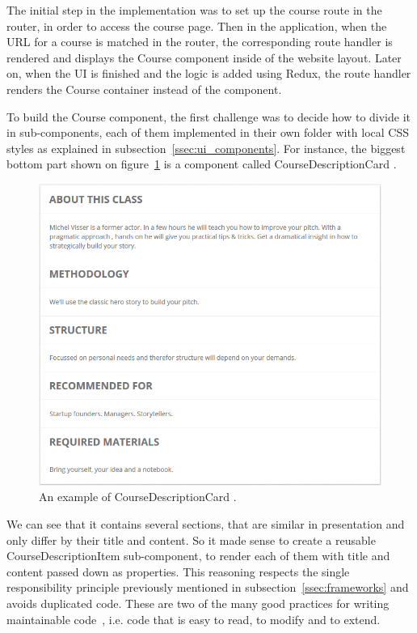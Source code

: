 The initial step in the implementation was to set up the course route in the router, in order to access the course page. Then in the application, when the URL for a course is matched in the router, the corresponding route handler is rendered and displays the \guillemotleft{} Course \guillemotright{} component inside of the website layout. Later on, when the UI is finished and the logic is added using Redux, the route handler renders the \guillemotleft{} Course \guillemotright{} container instead of the component.

To build the \guillemotleft{} Course \guillemotright{} component, the first challenge was to decide how to divide it in sub-components, each of them implemented in their own folder with local CSS styles as explained in {\sc subsection}~\ref{ssec:ui_components}. For instance, the biggest bottom part shown on {\sc figure}~\ref{fig:courseDescription} is a component called \guillemotleft{} CourseDescriptionCard \guillemotright{}.

\begin{figure}[H]
    \centering
    \includegraphics[scale=0.6]{figure/courseDescription.png}
    \caption{An example of \guillemotleft{} CourseDescriptionCard \guillemotright{}.}
    \label{fig:courseDescription}
\end{figure}

We can see that it contains several sections, that are similar in presentation and only differ by their title and content. So
it made sense to create a reusable \guillemotleft{} CourseDescriptionItem \guillemotright{} sub-component, to render each of them with title and content passed down as properties. This reasoning respects the single responsibility principle previously mentioned in {\sc subsection}~\ref{ssec:frameworks} and avoids duplicated code.
These are two of the many good practices for writing maintainable code~\cite{maintainable}, i.e. code that is easy to read, to modify and to extend.

